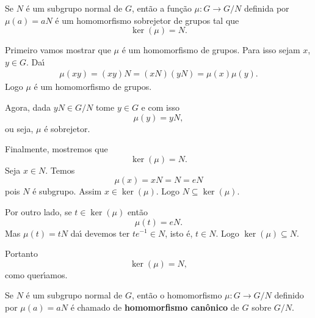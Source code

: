 \begin{proposicao}
    Se $N$ \'e um subgrupo normal de $G$, ent\~ao a fun\c{c}\~ao $\mu : G \to G/N$ definida por $\mu(a) = aN$ \'e um homomorfismo sobrejetor de grupos tal que
    \[
        \ker(\mu) = N.
    \]
\end{proposicao}
\begin{prova}
    Primeiro vamos mostrar que $\mu$ \'e um homomorfismo de grupos. Para isso sejam $x$, $y \in G$. Da{\'\i}
    \begin{align*}
        \mu(xy) = (xy)N = (xN)(yN) = \mu(x)\mu(y).
    \end{align*}
    Logo $\mu$ \'e um homomorfismo de grupos.

    Agora, dada $yN \in G/N$ tome $y \in G$ e com isso
    \[
        \mu(y) = yN,
    \]
    ou seja, $\mu$ \'e sobrejetor.

    Finalmente, mostremos que
    \[
        \ker(\mu) = N.
    \]
    Seja $x \in N$. Temos
    \[
        \mu(x) = xN = N = eN
    \]
    pois $N$ \'e subgrupo. Assim $x \in \ker(\mu)$. Logo $N \subseteq \ker(\mu)$.

    Por outro lado, se $t \in \ker(\mu)$ ent\~ao
    \[
        \mu(t) = eN.
    \]
    Mas $\mu(t) = tN$ da{\'\i} devemos ter $te^{-1} \in N$, isto \'e, $t \in N$. Logo $\ker(\mu) \subseteq N$.

    Portanto
    \[
        \ker(\mu) = N,
    \]
    como quer{\'\i}amos.
\end{prova}

\begin{definicao}
    Se $N$ \'e um subgrupo normal de $G$, ent\~ao o homomorfismo $\mu : G \to G/N$ definido por $\mu(a) = aN$ \'e chamado de \textbf{homomorfismo can\^onico} de $G$ sobre $G/N$.
\end{definicao}

